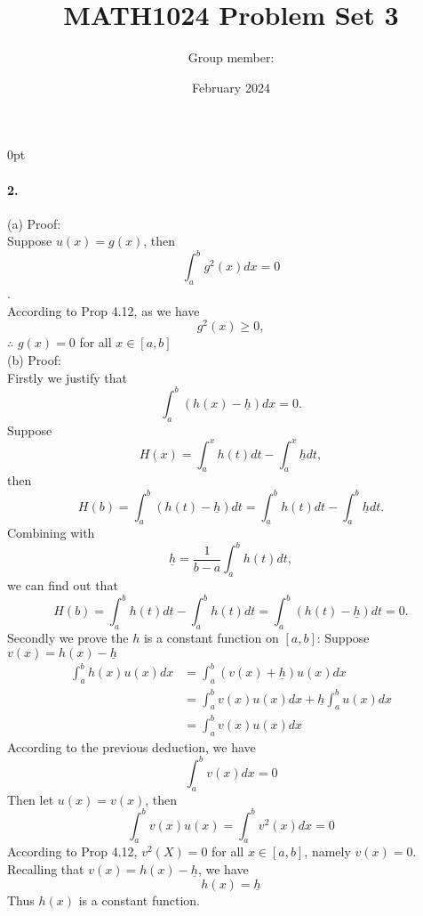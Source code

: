 \documentclass{article}
\title{ MATH1024 Problem Set 3}
\author{ Group member:}
\date{February 2024}
\begin{document}
\setlength {\parindent} {0pt}
\maketitle

\paragraph{2.}
(a) Proof:\\
Suppose $u(x)=g(x)$, then $$\int_{a}^{b} g^2(x)dx=0$$. \\
According to Prop 4.12, as we have 
$$g^2(x)\geq 0,$$
$\therefore$ $g(x)=0$ for all $x\in[a,b]$\\
(b) Proof:\\
Firstly we justify that
$$\int_{a}^{b}(h(x)-\underline{h})dx=0.$$
Suppose $$H(x)=\int_{a}^{x}h(t)dt-\int_{a}^{x}\underline{h}dt,$$
then $$H(b)=\int_{a}^{b}(h(t)-\underline{h})dt=\int_{a}^{b}h(t)dt-\int_{a}^{b}\underline{h}dt.$$
Combining  with
$$\underline{h}=\frac{1}{b-a}\int_{a}^{b}h(t)dt,$$
we can find out that 
$$H(b)=\int_{a}^{b}h(t)dt-\int_{a}^{b}h(t)dt=\int_{a}^{b}(h(t)-\underline{h})dt=0.$$
Secondly we prove the $h$ is a constant function on $[a,b]$:
Suppose $v(x)=h(x)-\underline{h}$
\begin{align*}
    \int_{a}^{b}h(x)u(x)dx&=\int_{a}^{b}(v(x)+\underline{h})u(x)dx\\
    &=\int_{a}^{b}v(x)u(x)dx+\underline{h}\int_{a}^{b}u(x)dx\\
    &=\int_{a}^{b}v(x)u(x)dx
\end{align*}
According to the previous deduction, we have
$$\int_{a}^{b}v(x)dx=0$$
Then let $u(x)=v(x)$, then
$$\int_{a}^{b}v(x)u(x)=\int_{a}^{b}v^2(x)dx=0$$
According to Prop 4.12, $v^2(X)=0$ for all $x\in [a,b]$, namely 
$v(x)=0$. Recalling that $v(x)=h(x)-\underline{h}$, we have
$$h(x)=\underline{h}$$
Thus $h(x)$ is a constant function.
\end{document}
